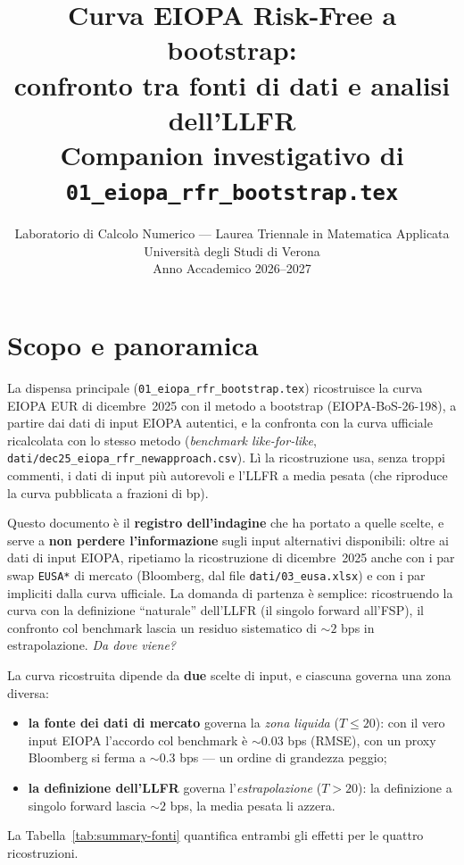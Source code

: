 \documentclass[11pt,a4paper]{article}
\title{%
  \textbf{Curva EIOPA Risk-Free a bootstrap:\\[3pt]
  confronto tra fonti di dati e analisi dell'LLFR}\\[6pt]
  \large Companion investigativo di \texttt{01\_eiopa\_rfr\_bootstrap.tex}\\[4pt]
}
\author{Laboratorio di Calcolo Numerico --- Laurea Triennale in Matematica Applicata\\
  Universit\`a degli Studi di Verona\\[2pt]
  Anno Accademico 2026--2027}
\date{}
\theoremstyle{definition}
\theoremstyle{remark}
\begin{document}
\maketitle
\tableofcontents
\newpage

\section{Scopo e panoramica}
\label{sec:scopo}

La dispensa principale (\texttt{01\_eiopa\_rfr\_bootstrap.tex}) ricostruisce la curva EIOPA
EUR di dicembre~2025 con il metodo a bootstrap (EIOPA-BoS-26-198), a partire dai dati di input
EIOPA autentici, e la confronta con la curva ufficiale ricalcolata con lo stesso metodo
(\emph{benchmark like-for-like}, \texttt{dati/dec25\_eiopa\_rfr\_newapproach.csv}). L\`i la
ricostruzione usa, senza troppi commenti, i dati di input pi\`u autorevoli e l'LLFR a media
pesata (che riproduce la curva pubblicata a frazioni di bp).

Questo documento \`e il \textbf{registro dell'indagine} che ha portato a quelle scelte, e
serve a \textbf{non perdere l'informazione} sugli input alternativi disponibili: oltre ai dati
di input EIOPA, ripetiamo la ricostruzione di dicembre~2025 anche con i par swap
\texttt{EUSA*} di mercato (Bloomberg, dal file \texttt{dati/03\_eusa.xlsx}) e con i par
impliciti dalla curva ufficiale. La domanda di partenza \`e semplice: ricostruendo la curva
con la definizione ``naturale'' dell'LLFR (il singolo forward all'FSP), il confronto col
benchmark lascia un residuo sistematico di $\sim 2$ bps in estrapolazione. \emph{Da dove
viene?}

\begin{keybox}
La curva ricostruita dipende da \textbf{due} scelte di input, e ciascuna governa una zona
diversa:
\begin{itemize}
  \item \textbf{la fonte dei dati di mercato} governa la \emph{zona liquida} ($T\le 20$): con
        il vero input EIOPA l'accordo col benchmark \`e $\sim0.03$ bps (RMSE), con un proxy
        Bloomberg si ferma a $\sim0.3$ bps --- un ordine di grandezza peggio;
  \item \textbf{la definizione dell'LLFR} governa l'\emph{estrapolazione} ($T>20$): la
        definizione a singolo forward lascia $\sim2$ bps, la media pesata li azzera.
\end{itemize}
La Tabella~\ref{tab:summary-fonti} quantifica entrambi gli effetti per le quattro
ricostruzioni.
\end{keybox}
\end{document}
